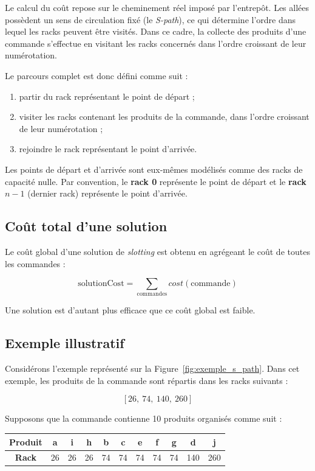 \documentclass{article}
\begin{document}
Le calcul du coût repose sur le cheminement réel imposé par l’entrepôt.  
Les allées possèdent un sens de circulation fixé (le \textit{S-path}), ce qui détermine l’ordre dans lequel les racks peuvent être visités.  
Dans ce cadre, la collecte des produits d’une commande s’effectue en visitant les racks concernés dans l’ordre croissant de leur numérotation.

Le parcours complet est donc défini comme suit :
\begin{enumerate}
    \item partir du rack représentant le point de départ ;
    \item visiter les racks contenant les produits de la commande, dans l’ordre croissant de leur numérotation ;
    \item rejoindre le rack représentant le point d’arrivée.
\end{enumerate}

Les points de départ et d'arrivée sont eux-mêmes modélisés comme des racks de capacité nulle. Par convention, le \textbf{rack 0} représente le point de départ et le \textbf{rack $n-1$} (dernier rack) représente le point d'arrivée.

\subsection{Coût total d’une solution}

Le coût global d’une solution de \textit{slotting} est obtenu en agrégeant le coût de toutes les commandes :

\[
\text{solutionCost} = \sum_{\text{commandes}} cost(\text{commande})
\]

Une solution est d’autant plus efficace que ce coût global est faible.


\subsection{Exemple illustratif}

Considérons l’exemple représenté sur la Figure~\ref{fig:exemple_s_path}.  
Dans cet exemple, les produits de la commande sont répartis dans les racks suivants :

\[
[26,\ 74,\ 140,\ 260]
\]

Supposons que la commande contienne 10 produits organisés comme suit :

\begin{center}
\begin{tabular}{|c|cccccccccc|}
\hline
\textbf{Produit} & a & i & h & b & c & e & f & g & d & j \\
\hline
\textbf{Rack}    & 26& 26& 26& 74 & 74 & 74 & 74 & 74 & 140 & 260 \\
\hline
\end{tabular}
\end{center}
\end{document}
